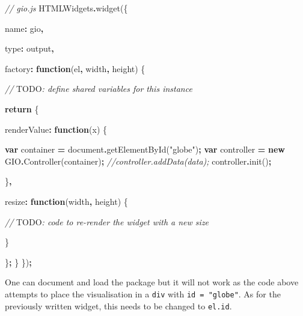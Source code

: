 \documentclass[
]{krantz}
\makeatletter
\newenvironment{Shaded}{\begin{snugshade}}{\end{snugshade}}
\newcommand{\AlertTok}[1]{\textcolor[rgb]{0.33,0.33,0.33}{#1}}
\newcommand{\BuiltInTok}[1]{#1}
\newcommand{\CommentTok}[1]{\textcolor[rgb]{0.37,0.37,0.37}{\textit{#1}}}
\newcommand{\ControlFlowTok}[1]{\textcolor[rgb]{0.27,0.27,0.27}{\textbf{#1}}}
\newcommand{\DataTypeTok}[1]{\textcolor[rgb]{0.27,0.27,0.27}{#1}}
\newcommand{\FunctionTok}[1]{\textcolor[rgb]{0,0,0}{#1}}
\newcommand{\KeywordTok}[1]{\textcolor[rgb]{0.27,0.27,0.27}{\textbf{#1}}}
\newcommand{\NormalTok}[1]{#1}
\newcommand{\OperatorTok}[1]{\textcolor[rgb]{0.43,0.43,0.43}{\textbf{#1}}}
\newcommand{\StringTok}[1]{\textcolor[rgb]{0.5,0.5,0.5}{#1}}
\newenvironment{kframe}{%
\medskip{}
\setlength{\fboxsep}{.8em}
 \def\at@end@of@kframe{}%
 \ifinner\ifhmode%
  \def\at@end@of@kframe{\end{minipage}}%
  \begin{minipage}{\columnwidth}%
 \fi\fi%
 \def\FrameCommand##1{\hskip\@totalleftmargin \hskip-\fboxsep
 \colorbox{shadecolor}{##1}\hskip-\fboxsep
     \hskip-\linewidth \hskip-\@totalleftmargin \hskip\columnwidth}%
 \MakeFramed {\advance\hsize-\width
   \@totalleftmargin\z@ \linewidth\hsize
   \@setminipage}}%
 {\par\unskip\endMakeFramed%
 \at@end@of@kframe}
\renewenvironment{Shaded}{\begin{kframe}}{\end{kframe}}
\makeatother
\begin{document}
\begin{Shaded}
\begin{Highlighting}[]
\CommentTok{// gio.js}
\NormalTok{HTMLWidgets}\OperatorTok{.}\FunctionTok{widget}\NormalTok{(\{}

  \DataTypeTok{name}\OperatorTok{:} \StringTok{\textquotesingle{}gio\textquotesingle{}}\OperatorTok{,}

  \DataTypeTok{type}\OperatorTok{:} \StringTok{\textquotesingle{}output\textquotesingle{}}\OperatorTok{,}

  \DataTypeTok{factory}\OperatorTok{:} \KeywordTok{function}\NormalTok{(el}\OperatorTok{,}\NormalTok{ width}\OperatorTok{,}\NormalTok{ height) \{}

    \CommentTok{// }\AlertTok{TODO}\CommentTok{: define shared variables for this instance}

    \ControlFlowTok{return}\NormalTok{ \{}

      \DataTypeTok{renderValue}\OperatorTok{:} \KeywordTok{function}\NormalTok{(x) \{}

        \KeywordTok{var}\NormalTok{ container }\OperatorTok{=} \BuiltInTok{document}\OperatorTok{.}\FunctionTok{getElementById}\NormalTok{(}\StringTok{"globe"}\NormalTok{)}\OperatorTok{;}
        \KeywordTok{var}\NormalTok{ controller }\OperatorTok{=} \KeywordTok{new}\NormalTok{ GIO}\OperatorTok{.}\FunctionTok{Controller}\NormalTok{(container)}\OperatorTok{;}
        \CommentTok{//controller.addData(data);}
\NormalTok{        controller}\OperatorTok{.}\FunctionTok{init}\NormalTok{()}\OperatorTok{;}

\NormalTok{      \}}\OperatorTok{,}

      \DataTypeTok{resize}\OperatorTok{:} \KeywordTok{function}\NormalTok{(width}\OperatorTok{,}\NormalTok{ height) \{}

        \CommentTok{// }\AlertTok{TODO}\CommentTok{: code to re{-}render the widget with a new size}

\NormalTok{      \}}

\NormalTok{    \}}\OperatorTok{;}
\NormalTok{  \}}
\NormalTok{\})}\OperatorTok{;}
\end{Highlighting}
\end{Shaded}

One can document and load the package but it will not work as the code above attempts to place the visualisation in a \texttt{div} with \texttt{id\ =\ "globe"}. As for the previously written widget, this needs to be changed to \texttt{el.id}.
\end{document}
